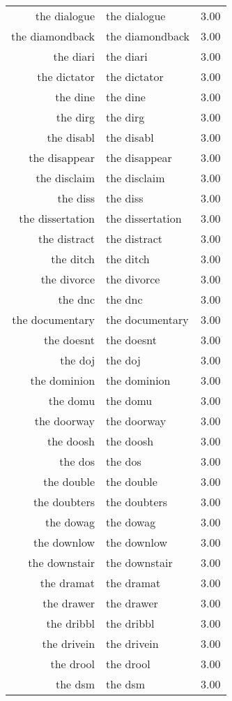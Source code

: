 \begin{table}[ht]
\begin{tabular}{rlr}
  the dialogue & the dialogue & 3.00 \\ 
  the diamondback & the diamondback & 3.00 \\ 
  the diari & the diari & 3.00 \\ 
  the dictator & the dictator & 3.00 \\ 
  the dine & the dine & 3.00 \\ 
  the dirg & the dirg & 3.00 \\ 
  the disabl & the disabl & 3.00 \\ 
  the disappear & the disappear & 3.00 \\ 
  the disclaim & the disclaim & 3.00 \\ 
  the diss & the diss & 3.00 \\ 
  the dissertation & the dissertation & 3.00 \\ 
  the distract & the distract & 3.00 \\ 
  the ditch & the ditch & 3.00 \\ 
  the divorce & the divorce & 3.00 \\ 
  the dnc & the dnc & 3.00 \\ 
  the documentary & the documentary & 3.00 \\ 
  the doesnt & the doesnt & 3.00 \\ 
  the doj & the doj & 3.00 \\ 
  the dominion & the dominion & 3.00 \\ 
  the domu & the domu & 3.00 \\ 
  the doorway & the doorway & 3.00 \\ 
  the doosh & the doosh & 3.00 \\ 
  the dos & the dos & 3.00 \\ 
  the double & the double & 3.00 \\ 
  the doubters & the doubters & 3.00 \\ 
  the dowag & the dowag & 3.00 \\ 
  the downlow & the downlow & 3.00 \\ 
  the downstair & the downstair & 3.00 \\ 
  the dramat & the dramat & 3.00 \\ 
  the drawer & the drawer & 3.00 \\ 
  the dribbl & the dribbl & 3.00 \\ 
  the drivein & the drivein & 3.00 \\ 
  the drool & the drool & 3.00 \\ 
  the dsm & the dsm & 3.00 \\ 

\end{tabular}
\end{table}
